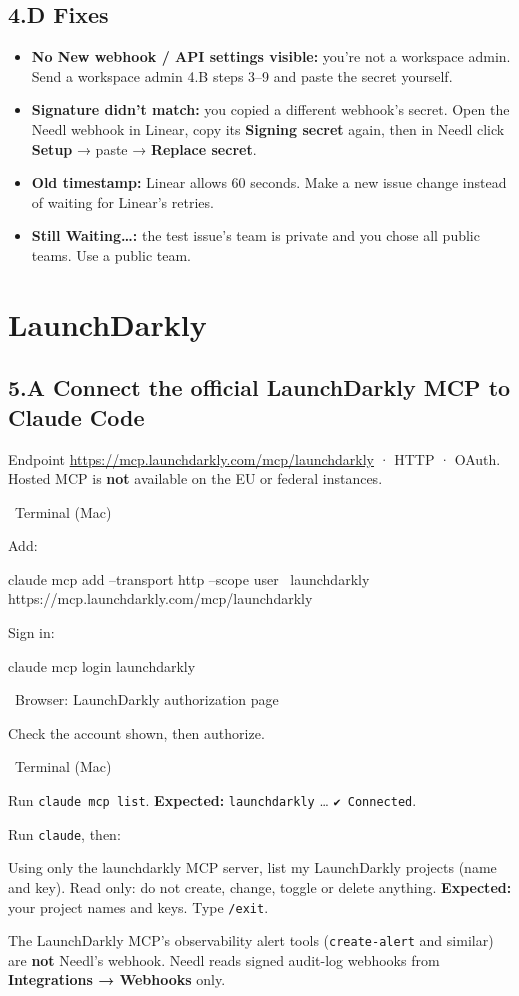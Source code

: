 \documentclass[11pt,a4paper]{article}
\newcommand{\ui}[1]{\textbf{#1}}
\newcommand{\where}[1]{\par\smallskip\noindent\colorbox{winbg}{\color{winfg}\bfseries\strut\ #1\ }\par\nopagebreak[4]}
\newcommand{\lit}[1]{\texttt{#1}}
\newenvironment{prompt}{\def\FrameCommand{\fboxsep=6pt\fcolorbox{Gray}{okbg}}\MakeFramed{\advance\hsize-\width\FrameRestore}\raggedright}{\endMakeFramed}
\begin{document}
\subsection*{4.D Fixes}
\begin{itemize}
\item \textbf{No \ui{New webhook} / \ui{API} settings visible:} you're not a workspace admin. Send a workspace admin 4.B steps 3–9 and paste the secret yourself.
\item \textbf{Signature didn't match:} you copied a different webhook's secret. Open the Needl webhook in Linear, copy its \ui{Signing secret} again, then in Needl click \ui{Setup} → paste → \ui{Replace secret}.
\item \textbf{Old timestamp:} Linear allows 60 seconds. Make a new issue change instead of waiting for Linear's retries.
\item \textbf{Still \ui{Waiting…}:} the test issue's team is private and you chose all public teams. Use a public team.
\end{itemize}

\clearpage
\section{LaunchDarkly}
\subsection*{5.A Connect the official LaunchDarkly MCP to Claude Code}
Endpoint \url{https://mcp.launchdarkly.com/mcp/launchdarkly} · HTTP · OAuth. Hosted MCP is \textbf{not} available on the EU or federal instances.
\where{Terminal (Mac)}
\begin{steps}
\item Add:
\begin{cmd}
claude mcp add --transport http --scope user \
  launchdarkly https://mcp.launchdarkly.com/mcp/launchdarkly
\end{cmd}
\item Sign in:
\begin{cmd}
claude mcp login launchdarkly
\end{cmd}
\where{Browser: LaunchDarkly authorization page}
\item Check the account shown, then authorize.
\where{Terminal (Mac)}
\item Run \lit{claude mcp list}. \textbf{Expected:} \lit{launchdarkly} … \lit{✔ Connected}.
\item Run \lit{claude}, then:
\begin{prompt}
Using only the launchdarkly MCP server, list my LaunchDarkly projects (name and key). Read only: do not create, change, toggle or delete anything.
\end{prompt}
\textbf{Expected:} your project names and keys. Type \lit{/exit}.
\end{steps}
The LaunchDarkly MCP's observability alert tools (\lit{create-alert} and similar) are \textbf{not} Needl's webhook. Needl reads signed audit-log webhooks from \ui{Integrations → Webhooks} only.
\end{document}
